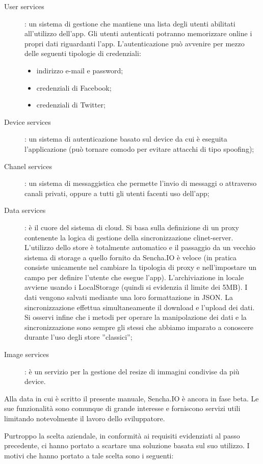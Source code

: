 \documentclass[10pt,a4paper,onecolumn]{article}
\begin{document}
\begin{description}
	\item[User services]: un sistema di gestione che mantiene una lista degli utenti abilitati all'utilizzo dell'app. Gli utenti autenticati potranno memorizzare online i propri dati riguardanti l'app. L'autenticazione può avvenire per mezzo delle seguenti tipologie di credenziali:
		\begin{itemize}
			\item indirizzo e-mail e password;
			\item credenziali di Facebook;
			\item credenziali di Twitter;
		\end{itemize}
	\item[Device services]: un sistema di autenticazione basato sul device da cui è eseguita l'applicazione (può tornare comodo per evitare attacchi di tipo spoofing);
	\item[Chanel services]: un sistema di messaggistica che permette l'invio di messaggi o attraverso canali privati, oppure a tutti gli utenti facenti uso dell'app;
	\item[Data services]: è il cuore del sistema di cloud. Si basa sulla definizione di un proxy contenente la logica di gestione della sincronizzazione clinet-server. L'utilizzo dello store è totalmente automatico e il passaggio da un vecchio sistema di storage a quello fornito da Sencha.IO è veloce (in pratica consiste unicamente nel cambiare la tipologia di proxy e nell'impostare un campo per definire l'utente che esegue l'app). L'archiviazione in locale avviene usando i LocalStorage (quindi si evidenzia il limite dei 5MB). I dati vengono salvati mediante una loro formattazione in JSON. La sincronizzazione effettua simultaneamente il download e l'upload dei dati. Si osservi infine che i metodi per operare la manipolazione dei dati e la sincronizzazione sono sempre gli stessi che abbiamo imparato a conoscere durante l'uso degli store ''classici'';
	\item[Image services]: è un servizio per la gestione del resize di immagini condivise da più device.
\end{description}

Alla data in cui è scritto il presente manuale, Sencha.IO è ancora in fase beta. Le sue funzionalità sono comunque di grande interesse e forniscono servizi utili limitando notevolmente il lavoro dello sviluppatore.

Purtroppo la scelta aziendale, in conformità ai requisiti evidenziati al passo precedente, ci hanno portato a scartare una soluzione basata sul suo utilizzo. I motivi che hanno portato a tale scelta sono i seguenti:
\end{document}
